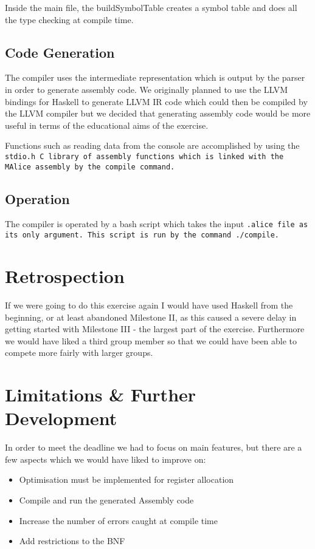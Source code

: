 \documentclass[11pt]{article}
\begin{document}
Inside the main file, the buildSymbolTable creates a symbol table and does all the type checking at compile time. 

\subsection{Code Generation}
The compiler uses the intermediate representation which is output by the parser in order to generate assembly code. We originally planned to use the LLVM bindings for Haskell to generate LLVM IR code which could then be compiled by the LLVM compiler but we decided that generating assembly code would be more useful in terms of the educational aims of the exercise.

Functions such as reading data from the console are accomplished by using the \tt stdio.h \rm C library of assembly functions which is linked with the MAlice assembly by the \tt compile \rm command.

\subsection{Operation}
The compiler is operated by a bash script which takes the input \tt .alice \rm file as its only argument. This script is run by the command \tt ./compile\rm .

\section{Retrospection}
If we were going to do this exercise again I would have used Haskell from the beginning, or at least abandoned Milestone II, as this caused a severe delay in getting started with Milestone III - the largest part of the exercise. Furthermore we would have liked a third group member so that we could have been able to compete more fairly with larger groups.

\section{Limitations \& Further Development}
In order to meet the deadline we had to focus on main features, but there are a few aspects which we would have liked to improve on:

\begin{itemize}
\item Optimisation must be implemented for register allocation
\item Compile and run the generated Assembly code
\item Increase the number of errors caught at compile time
\item Add restrictions to the BNF
\end{itemize}
\end{document}
